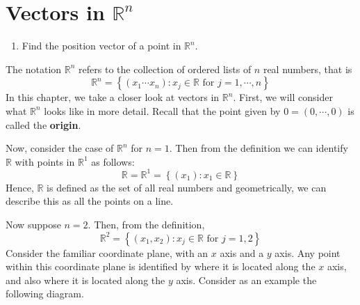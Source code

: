 \section{Vectors in $\mathbb{R}^n$}

\begin{outcome}

\begin{enumerate}
\item[A.] Find the position vector of a point in $\mathbb{R}^n$.
\end{enumerate}
\end{outcome}

The notation $\mathbb{R}^{n}$ refers to the collection of ordered lists of 
$n$ real numbers, that is 
\[
\mathbb{R}^{n} = \left\{ \left( x_{1}\cdots x_{n}\right)
:x_{j}\in \mathbb{R}\text{ for }j=1,\cdots ,n\right\}
\]
In this chapter, we take a closer look at vectors in $\mathbb{R}^n$. First, we will consider what $\mathbb{R}^n$ looks like 
in more detail. Recall that the point given by $0=\left( 0, \cdots, 0 \right)$ is called the \textbf{origin}.

Now, consider the case of $\mathbb{R}^n$ for $n=1.$ Then from the definition we can identify 
$\mathbb{R}$ with points in $\mathbb{R}^{1}$ as follows:
\begin{equation*}
\mathbb{R} = \mathbb{R}^{1}=
 \left\{ \left( x_{1}\right) :x_{1}\in \mathbb{R} \right\}
\end{equation*}
Hence, $\mathbb{R}$ is defined as the set of all real numbers and geometrically,
we can describe this as all the points on a line.

Now suppose $n=2$. Then, from the definition,
\begin{equation*}
\mathbb{R}^{2}=
\left\{ \left(x_{1}, x_{2}\right)
:x_{j}\in \mathbb{R}\text{ for }j=1,2 \right\}
\end{equation*}
Consider the
familiar coordinate plane, with an $x$ axis and a $y$ axis. Any point
within this coordinate plane is identified by where it is located
along the $x$ axis, and also where it is located along the $y$
axis. Consider as an example the following diagram.

\begin{center}
\par{}\label{fig:RnVectorsRn-tikz01}%

\end{center}

